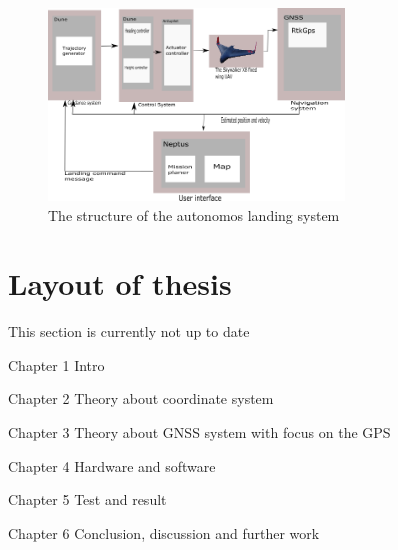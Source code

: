\begin{figure}[H]
	\centering
		\includegraphics[width=0.7\textwidth]{figs/SystemOverview.png}
		\caption{The structure of the autonomos landing system}
		\label{figure:SystemOverview}
\end{figure}
\section{Layout of thesis}
This section is currently not up to date

Chapter 1 Intro

Chapter 2 Theory about coordinate system

Chapter 3 Theory about GNSS system with focus on the GPS

Chapter 4 Hardware and software

Chapter 5 Test and result

Chapter 6 Conclusion, discussion and further work


